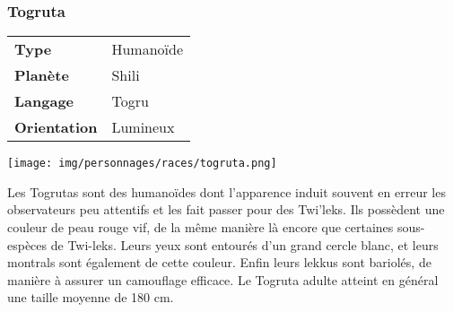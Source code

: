 \subsubsection{Togruta}
\begin{samepage}
	\begin{tabular}{ l l }
		\textbf{Type} 			& Humanoïde \\
	   	\textbf{Planète} 		& Shili \\
	   	\textbf{Langage} 		& Togru \\
	   	\textbf{Orientation} 	& Lumineux \\
	\end{tabular}

	\vspace{-9\baselineskip}
	\begin{flushright}
		\texttt{[image: img/personnages/races/togruta.png]}
	\end{flushright}

	\vspace{-2\baselineskip}
\end{samepage}

Les Togrutas sont des humanoïdes dont l’apparence induit souvent en erreur les observateurs peu attentifs et les fait passer pour des Twi’leks. Ils possèdent une couleur de peau rouge vif, de la même manière là encore que certaines sous-espèces de Twi-leks. Leurs yeux sont entourés d’un grand cercle blanc, et leurs montrals sont également de cette couleur. Enfin leurs lekkus sont bariolés, de manière à assurer un camouflage efficace. Le Togruta adulte atteint en général une taille moyenne de 180 cm. 


